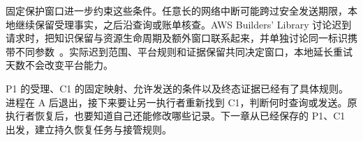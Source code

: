 
固定保护窗口进一步约束这些条件。任意长的网络中断可能跨过安全发送期限，本地继续保留受理事实，之后沿查询或账单核查。AWS Builders' Library 讨论迟到请求时，把知识保留与资源生命周期及额外窗口联系起来，并单独讨论同一标识携带不同参数~\cite{aws-idempotent}。实际迟到范围、平台规则和证据保留共同决定窗口，本地延长重试天数不会改变平台能力。

P1 的受理、C1 的固定映射、允许发送的条件以及终态证据已经有了具体规则。进程在 A 后退出，接下来要让另一执行者重新找到 C1，判断何时查询或发送。原执行者恢复后，也要知道自己还能修改哪些记录。下一章从已经保存的 P1、C1 出发，建立持久恢复任务与接管规则。
